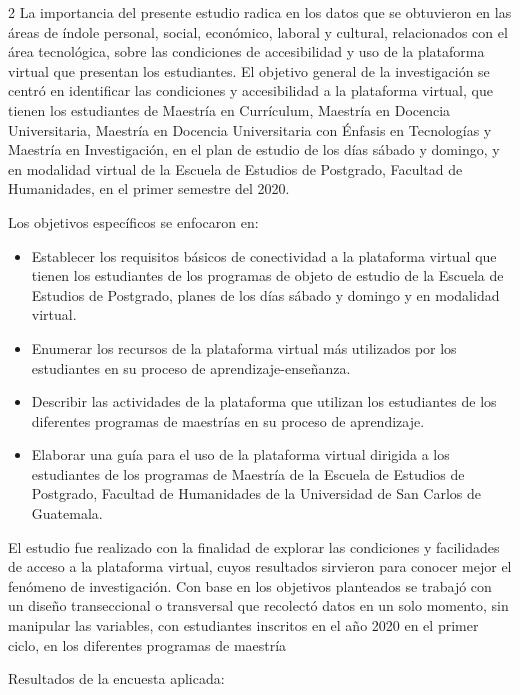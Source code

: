 \documentclass[12pt,spanish,Letterpaper,openany]{book}
\begin{document}
\begin {multicols}{2}
La importancia del presente estudio radica en los datos que se obtuvieron en las áreas de índole
personal, social, económico, laboral y cultural, relacionados con el área tecnológica, sobre las
condiciones de accesibilidad y uso de la plataforma virtual que presentan los estudiantes.
El objetivo general de la investigación se centró en identificar las condiciones y accesibilidad a la
plataforma virtual, que tienen los estudiantes de Maestría en Currículum, Maestría en Docencia
Universitaria, Maestría en Docencia Universitaria con Énfasis en Tecnologías y Maestría en
Investigación, en el plan de estudio de los días sábado y domingo, y en modalidad virtual de la
Escuela de Estudios de Postgrado, Facultad de Humanidades, en el primer semestre del 2020.

Los objetivos específicos se enfocaron en:

\begin{itemize}
\item
  Establecer los requisitos básicos de conectividad a la plataforma virtual que tienen los
  estudiantes de los programas de objeto de estudio de la Escuela de Estudios de Postgrado,
  planes de los días sábado y domingo y en modalidad virtual.
\item
  Enumerar los recursos de la plataforma virtual más utilizados por los estudiantes en su
  proceso de aprendizaje-enseñanza.
\item
  Describir las actividades de la plataforma que utilizan los estudiantes de los diferentes
  programas de maestrías en su proceso de aprendizaje.
\item
  Elaborar una guía para el uso de la plataforma virtual dirigida a los estudiantes de los
  programas de Maestría de la Escuela de Estudios de Postgrado, Facultad de Humanidades
  de la Universidad de San Carlos de Guatemala.
\end{itemize}

El estudio fue realizado con la finalidad de explorar las condiciones y facilidades de acceso a la
plataforma virtual, cuyos resultados sirvieron para conocer mejor el fenómeno de investigación.
Con base en los objetivos planteados se trabajó con un diseño transeccional o transversal que
recolectó datos en un solo momento, sin manipular las variables, con estudiantes inscritos en el
año 2020 en el primer ciclo, en los diferentes programas de maestría

Resultados de la encuesta aplicada:


\end{multicols}
\end{document}
